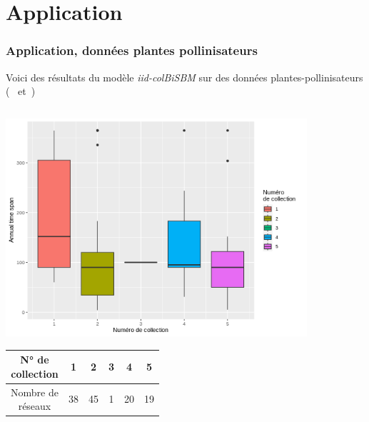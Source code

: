 \documentclass{beamer}
\begin{document}
\section{Application}
\label{sec:application}
\begin{frame}
    \frametitle{Application, données plantes pollinisateurs}
    \small
    Voici des résultats du modèle \emph{iid-colBiSBM} sur des données
    plantes-pollinisateurs (~\cite{doreRelativeEffectsAnthropogenic2021}
    et~\cite{thebaultDatabasePlantpollinatorNetworks2020})
    \begin{columns}
        \begin{column}{0.48\linewidth}
            \includegraphics[scale=0.32]{img/annual_time_span_vs_iid.png}
            \begin{center}
                \begin{tabular}{ |c|c|c|c|c|c| }
                    \hline
                    \thead{N° de     \\collection} & 1 & 2 & 3 & 4 & 5 \\
                    \hline
                    \thead{Nombre de \\réseaux} & 38 & 45 & 1 & 20 & 19 \\
                    \hline
                \end{tabular}
            \end{center}
        \end{column}
        \begin{column}{0.48\linewidth}
            \begin{figure}[H]

\end{figure}
\end{column}
\end{columns}
\end{frame}
\end{document}
